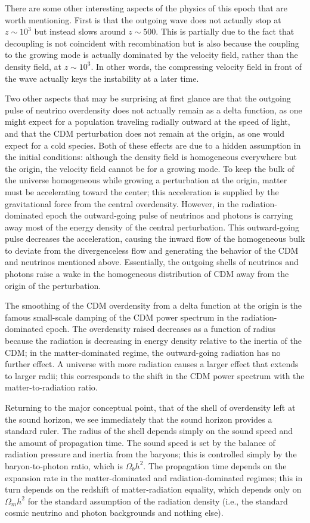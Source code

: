\documentclass[a4paper,11pt]{article}
\begin{document}
{\noindent}There are some other interesting aspects of the physics of this epoch that are worth mentioning. First is that the outgoing wave does not actually stop at $z\sim10^3$ but instead slows around $z\sim500$. This is partially due to the fact that decoupling is not coincident with recombination but is also because the coupling to the growing mode is actually dominated by the velocity field, rather than the density field, at $z\sim10^3$. In other words, the compressing velocity field in front of the wave actually keys the instability at a later time.

{\noindent}Two other aspects that may be surprising at first
glance are that the outgoing pulse of neutrino overdensity does not actually remain as a delta function, as one might expect for a population traveling radially outward at the speed of light, and that the CDM perturbation does not remain at the origin, as one would expect for a cold species. Both of these effects are due to a hidden assumption in the initial conditions: although the density field is homogeneous everywhere but the origin, the velocity field cannot be for a growing mode. To keep the bulk of the universe homogeneous while growing a perturbation at the origin, matter
must be accelerating toward the center; this acceleration is supplied by the gravitational force from the central overdensity. However, in the radiation-dominated epoch the outward-going pulse of neutrinos and photons is carrying away most of the energy density of the central perturbation. This outward-going pulse decreases the acceleration, causing the inward flow of the homogeneous bulk to deviate from the divergenceless flow and generating the behavior of the CDM and neutrinos mentioned above. Essentially,
the outgoing shells of neutrinos and photons raise a wake in the homogeneous distribution of CDM away from the origin
of the perturbation.

{\noindent}The smoothing of the CDM overdensity from a delta function at the origin is the famous small-scale damping of the CDM power spectrum in the radiation-dominated epoch. The overdensity raised decreases as a function of radius because the radiation is decreasing in energy density relative to the inertia of the CDM; in the matter-dominated regime, the outward-going radiation has no further effect. A universe with more radiation causes a larger effect that extends to larger radii; this corresponds to the shift in the CDM power spectrum with the matter-to-radiation ratio.

{\noindent}Returning to the major conceptual point, that of the shell of overdensity left at the sound horizon, we see immediately that the sound horizon provides a standard ruler. The radius of the shell depends simply on the sound speed and the amount of propagation time. The sound speed is set by the balance of radiation pressure and inertia from the baryons; this is controlled simply by the baryon-to-photon ratio, which is $\Omega_bh^2$. The propagation time depends on the expansion rate in the matter-dominated and radiation-dominated regimes; this in turn depends on the redshift of matter-radiation equality, which depends only on $\Omega_mh^2$ for the standard assumption of the radiation density (i.e., the standard cosmic neutrino and photon backgrounds and nothing else).
\end{document}

